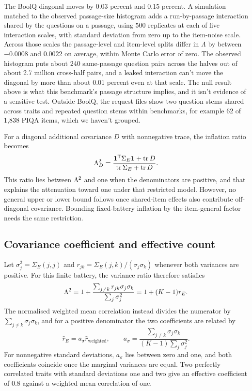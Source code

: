 The BoolQ diagonal moves by 0.03 percent and 0.15 percent. A simulation matched to the observed passage-size histogram adds a run-by-passage interaction shared by the questions on a passage, using 500 replicates at each of five interaction scales, with standard deviation from zero up to the item-noise scale. Across those scales the passage-level and item-level splits differ in $\Lambda$ by between $-0.0008$ and $0.0022$ on average, within Monte Carlo error of zero. The observed histogram puts about 240 same-passage question pairs across the halves out of about 2.7 million cross-half pairs, and a leaked interaction can't move the diagonal by more than about 0.01 percent even at that scale. The null result above is what this benchmark's passage structure implies, and it isn't evidence of a sensitive test. Outside BoolQ, the request files show two question stems shared across traits and repeated question stems within benchmarks, for example 62 of 1,838 PIQA items, which we haven't grouped.

For a diagonal additional covariance $D$ with nonnegative trace, the inflation ratio becomes
\begin{equation}
\Lambda_D^2=\frac{\mathbf1^{\mathsf T}\Sigma_E\mathbf1+\operatorname{tr}D}
{\operatorname{tr}\Sigma_E+\operatorname{tr}D}. \end{equation}
This ratio lies between $\Lambda^2$ and one when the denominators are positive, and that explains the attenuation toward one under that restricted model. However, no general upper or lower bound follows once shared-item effects also contribute off-diagonal covariance. Bounding fixed-battery inflation by the item-general factor needs the same restriction.

\subsection{Covariance coefficient and effective count}
Let $\sigma_j^2=\Sigma_E(j,j)$ and $r_{jk}=\Sigma_E(j,k)/(\sigma_j\sigma_k)$ whenever both variances are positive. For this finite battery, the variance ratio therefore satisfies
\begin{equation}
\Lambda^2=1+\frac{\sum_{j\ne k}r_{jk}\sigma_j\sigma_k}{\sum_j\sigma_j^2}
=1+(K-1)\bar r_E.
\end{equation}
The normalised weighted mean correlation instead divides the numerator by $\sum_{j\ne k}\sigma_j\sigma_k$, and for a positive denominator the two coefficients are related by
\begin{equation}
\bar r_E=a_\sigma\bar r_{\mathrm{weighted}},\qquad
a_\sigma=\frac{\sum_{j\ne k}\sigma_j\sigma_k}{(K-1)\sum_j\sigma_j^2}.
\end{equation}
For nonnegative standard deviations, $a_\sigma$ lies between zero and one, and both coefficients coincide once the marginal variances are equal. Two perfectly correlated traits with standard deviations one and two give an effective coefficient of 0.8 against a weighted mean correlation of one.

